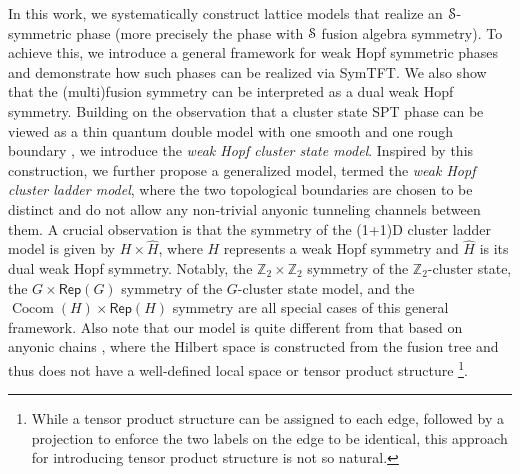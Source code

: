 \documentclass[a4paper,11pt]{article}
\theoremstyle{theorem}
\theoremstyle{remark}
\newcommand\eS         {\EuScript{S}}
\newcommand{\Rep}{\mathsf{Rep}}
\newcommand{\Cocom}{\operatorname{Cocom}}
\begin{document}
In this work, we systematically construct lattice models that realize an \( \eS \)-symmetric phase (more precisely the phase with $\eS$ fusion algebra symmetry). To achieve this, we introduce a general framework for weak Hopf symmetric phases and demonstrate how such phases can be realized via SymTFT. We also show that the (multi)fusion symmetry can be interpreted as a dual weak Hopf symmetry.
Building on the observation that a cluster state SPT phase can be viewed as a thin quantum double model with one smooth and one rough boundary \cite{jia2024generalized}, we introduce the \emph{weak Hopf cluster state model}. Inspired by this construction, we further propose a generalized model, termed the \emph{weak Hopf cluster ladder model}, where the two topological boundaries are chosen to be distinct and do not allow any non-trivial anyonic tunneling channels between them. 
A crucial observation is that the symmetry of the (1+1)D cluster ladder model is given by \( H \times \hat{H} \), where \( H \) represents a weak Hopf symmetry and \( \hat{H} \) is its dual weak Hopf symmetry. Notably, the \( \mathbb{Z}_2 \times \mathbb{Z}_2 \) symmetry of the \( \mathbb{Z}_2 \)-cluster state, the \( G \times \Rep(G) \) symmetry of the \( G \)-cluster state model, and the \( \Cocom(H) \times \Rep(H) \) symmetry are all special cases of this general framework.
Also note that our model is quite different from that based on anyonic chains \cite{Feiguin2007interacting, trebst2008short, buican2017anyonic, bhardwaj2024lattice, bhardwaj2024gappedphases}, where the Hilbert space is constructed from the fusion tree and thus does not have a well-defined local space or tensor product structure \footnote{While a tensor product structure can be assigned to each edge, followed by a projection to enforce the two labels on the edge to be identical, this approach for introducing tensor product structure is not so natural.}.
\end{document}
